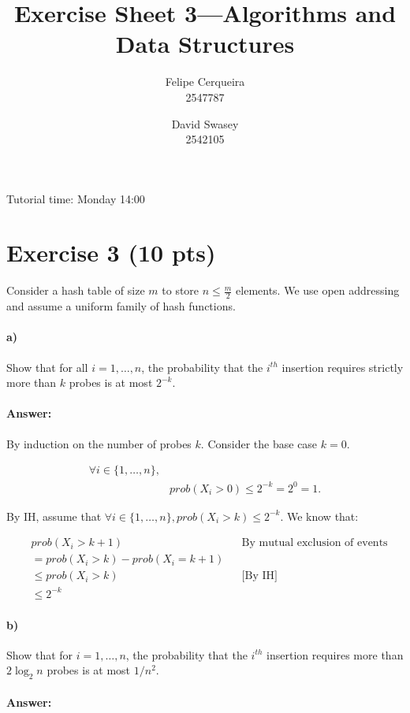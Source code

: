 \documentclass[a4paper]{article}
\title{Exercise Sheet 3---Algorithms and Data Structures}
\author{Felipe Cerqueira \\ 2547787 \and David Swasey \\ 2542105}
\begin{document}
\maketitle

Tutorial time: Monday 14:00

\section{Exercise 3 (10 pts)}

\noindent Consider a hash table of size $m$ to store $n \le  \frac{m}{2}$ elements. We use open addressing and assume a uniform family of hash functions.

\paragraph{a)} Show that for all $i = 1, \ldots, n$, the probability that the $i^{th}$ insertion requires strictly more than $k$ probes is at most $2^{-k}$.

\paragraph{Answer:}

By induction on the number of probes $k$. Consider the base case $k=0$.


\begin{align*}
\forall i \in \{1, \ldots, n\}, \\
& {prob}(X_i > 0) \le 2^{-k} = 2^0 = 1.
\end{align*}

By IH, assume that $\forall i \in \{1, \ldots, n\}, {prob}(X_i > k) \le 2^{-k}$. We know that:

\begin{align*}
& {prob}(X_i > k+1) && \text{By mutual exclusion of events} \\
& = {prob}(X_i > k) - {prob}(X_i = k+1) \\
& \le {prob}(X_i > k) && \text{[By IH]} \\
& \le 2^{-k}
\end{align*}

\paragraph{b)} Show that for $i = 1, \ldots, n$, the probability that the $i^{th}$ insertion requires more than $2 \log_2 n$ probes is at most $1/n^2$.

\paragraph{Answer:}
\end{document}
